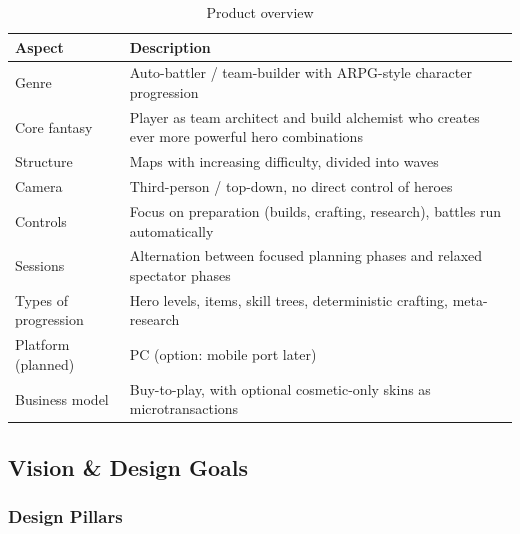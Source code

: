 \begin{table}[h]
	\centering
	\begin{tabular}{p{4cm}p{9cm}}
		\textbf{Aspect} & \textbf{Description} \\
		\hline
		Genre & Auto-battler / team-builder with ARPG-style character progression \\
		Core fantasy & Player as team architect and build alchemist who creates ever more powerful hero combinations \\
		Structure & Maps with increasing difficulty, divided into waves \\
		Camera & Third-person / top-down, no direct control of heroes \\
		Controls & Focus on preparation (builds, crafting, research), battles run automatically \\
		Sessions & Alternation between focused planning phases and relaxed spectator phases \\
		Types of progression & Hero levels, items, skill trees, deterministic crafting, meta-research \\
		Platform (planned) & PC (option: mobile port later) \\
		Business model & Buy-to-play, with optional cosmetic-only skins as microtransactions \\
	\end{tabular}
	\caption{Product overview}
	\label{tab:product-summary}
\end{table}

\subsection{Vision \& Design Goals}

\subsubsection*{Design Pillars}

